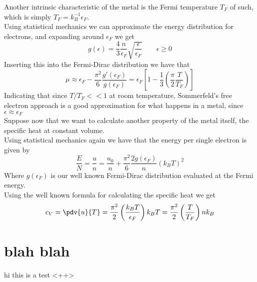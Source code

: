 \documentclass[../qm.tex]{subfiles}
\begin{document}
Another intrinsic characteristic of the metal is the Fermi temperature $T_F$ of such, which is simply $T_F=k_B^{-1}\epsilon_F$.\\
Using statistical mechanics we can approximate the energy distribution for electrons, and expanding around $\epsilon_F$ we get
\begin{equation*}
	g(\epsilon)=\frac{4}{3}\frac{n}{\epsilon_F}\sqrt{\frac{\epsilon}{\epsilon_F}}\qquad\epsilon\ge0
\end{equation*}
Inserting this into the Fermi-Dirac distribution we have that
\begin{equation*}
	\mu\approx\epsilon_F-\frac{\pi^2}{6}\frac{g'(\epsilon_F)}{g(\epsilon_F)}=\epsilon_F\left[ 1-\frac{1}{3}\left( \frac{\pi}{2}\frac{T}{T_F} \right) \right]
\end{equation*}
Indicating that since $T/T_F<<1$ at room temperature, Sommerfeld's free electron approach is a good approximation for what happens in a metal, since $\epsilon\approx\epsilon_F$\\
Suppose now that we want to calculate another property of the metal itself, the specific heat at constant volume.\\
Using statistical mechanics again we have that the energy per single electron is given by
\begin{equation*}
	\frac{E}{N}=\frac{u}{n}=\frac{u_0}{n}+\frac{\pi^2}{6}\frac{2g(\epsilon_F)}{n}\left(k_BT\right)^2
\end{equation*}
Where $g(\epsilon_F)$ is our well known Fermi-Dirac distribution evaluated at the Fermi energy.\\
Using the well known formula for calculating the specific heat we get
\begin{equation*}
	c_V=\pdv{u}{T}=\frac{\pi^2}{2}\left( \frac{k_BT}{\epsilon_F} \right)k_BT=\frac{\pi^2}{2}\left( \frac{T}{T_F} \right)nk_B
\end{equation*}
\section{blah blah}
hi this is a test <++>
\end{document}
